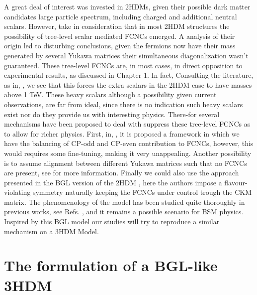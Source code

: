 A great deal of interest was invested in 2HDMs, given their possible dark matter candidates large particle spectrum, including charged and additional neutral scalars.
%
However, take in consideration that in most 2HDM structures the possibility of tree-level scalar mediated FCNCs emerged. 
% 
A analysis of their origin led to disturbing conclusions, given the fermions now have their mass generated by several Yukawa matrices their simultaneous diagonalization wasn't guaranteed. 
%
These tree-level FCNCs are, in most cases, in direct opposition to experimental results, as discussed in Chapter 1. 
%
In fact, Consulting the literature, as in, \cite{Branco:1999fs}, we see that this forces the extra scalars in the 2HDM case to have masses above 1 TeV.
%
These heavy scalars although a possibility given current observations, are far from ideal, since there is no indication such heavy scalars exist nor do they provide us with interesting physics. 
%
There-for several mechanisms have been proposed to deal with suppress these tree-level FCNCs as to allow for richer physics. 
%
First, in, \cite{Ferreira_2011,Nebot_2015,ferreira2019strong}, it is proposed a framework in which we have the balancing of CP-odd and CP-even contribution to FCNCs, however, this would requires some fine-tuning, making it very unappealing. 
% 
Another possibility is to assume alignment between different Yukawa matrices such that no FCNCs are present, see \cite{Pich_2009,Jung_2010,Jung_2011} for more information. 
%
Finally we could also use the approach presented in the BGL version of the 2HDM \cite{Branco_1996,LAVOURA1994}, here the authors impose a flavour-violating symmetry naturally keeping the FCNCs under control trough the CKM matrix. 
%
The phenomenology of the model has been studied quite thoroughly in previous works, see Refs. \cite{Botella_2014,Botella_2016}, and it remains a possible scenario for BSM physics.
%
Inspired by this BGL model our studies will try to reproduce a similar mechanism on a 3HDM Model. 


\section{The formulation of a BGL-like 3HDM} 

